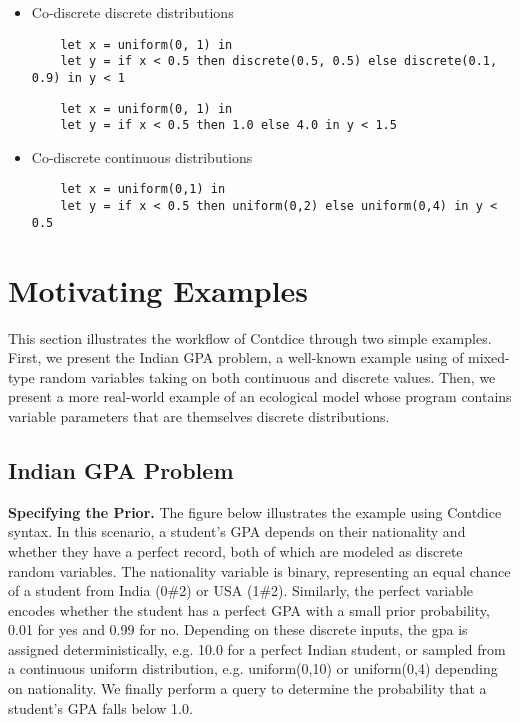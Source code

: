 \documentclass[nonacm,anonymous]{acmart}
\begin{document}
\begin{itemize}
    \item Co-discrete discrete distributions
    \begin{lstlisting}
    let x = uniform(0, 1) in
    let y = if x < 0.5 then discrete(0.5, 0.5) else discrete(0.1, 0.9) in y < 1
    \end{lstlisting}

    \begin{lstlisting}
    let x = uniform(0, 1) in
    let y = if x < 0.5 then 1.0 else 4.0 in y < 1.5
    \end{lstlisting}

    \item Co-discrete continuous distributions
    \begin{lstlisting}
    let x = uniform(0,1) in 
    let y = if x < 0.5 then uniform(0,2) else uniform(0,4) in y < 0.5
    \end{lstlisting}
\end{itemize}


\section{Motivating Examples}
This section illustrates the workflow of Contdice through two simple examples. First, we present the Indian GPA problem, a well-known example using of mixed-type random variables taking on both continuous and discrete values. Then, we present a more real-world example of an ecological model whose program contains variable parameters that are themselves discrete distributions.

\subsection{Indian GPA Problem}

\textbf{Specifying the Prior.} The figure below illustrates the example using Contdice syntax. In this scenario, a student's GPA depends on their nationality and whether they have a perfect record, both of which are modeled as discrete random variables. The nationality variable is binary, representing an equal chance of a student from India (0\#2) or USA (1\#2). Similarly, the perfect variable encodes whether the student has a perfect GPA with a small prior probability, 0.01 for yes and 0.99 for no. Depending on these discrete inputs, the gpa is assigned deterministically, e.g. 10.0 for a perfect Indian student, or sampled from a continuous uniform distribution, e.g. uniform(0,10) or uniform(0,4) depending on nationality. We finally perform a query to determine the probability that a student's GPA falls below 1.0.
\end{document}
